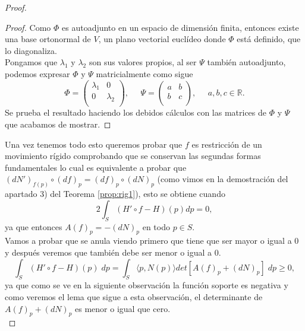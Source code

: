 \begin{proof}
	\begin{proof}
		Como $\Phi$ es autoadjunto en un espacio de dimensión finita, entonces existe una base ortonormal de $V$, un plano vectorial euclídeo donde $\Phi$ está definido, que lo diagonaliza.
		${ }$\\
		
		Pongamos que $\lambda_1$ y $\lambda_2$ son sus valores propios, al ser $\Psi$ también autoadjunto, podemos expresar $\Phi$ y $\Psi$ matricialmente como sigue
		${ }$\\
		\[
			\Phi = \left( {\begin{array}{cc}
				\lambda_1 & 0 \\
				0 & \lambda_2 \\
				\end{array} } \right),
			\;\;\;\;\;
			\Psi = \left( {\begin{array}{cc}
				a & b \\
				b & c \\
				\end{array} } \right), \;\;\;\;\; a, b,c \in \mathbb{R}.
		\]
		${ }$\\
		
		Se prueba el resultado haciendo los debidos cálculos con las matrices de $\Phi$ y $\Psi$ que acabamos de mostrar.
	\end{proof}
	${ }$\\
	
	Una vez tenemos todo esto queremos probar que $f$ es restricción de un movimiento rígido comprobando que se conservan las segundas formas fundamentales lo cual es equivalente a probar que $(dN')_{f(p)} \circ (df)_p = (df)_p \circ (dN)_p$ (como vimos en la demostración del apartado 3) del Teorema \ref{prop:rig1}), esto se obtiene cuando
	${ }$\\
	\[
		2\int_S (H' \circ f - H)(p) dp = 0,
	\]
	${ }$\\
	ya que entonces $A(f)_p = -(dN)_p$ en todo $p \in S$.
	${ }$\\
	
	Vamos a probar que se anula viendo primero que tiene que ser mayor o igual a 0 y después veremos que también debe ser menor o igual a 0.
	${ }$\\
	\[
		\int_S (H' \circ f - H)(p) \; dp = \int_S \langle p, N(p) \rangle det[A(f)_p + (dN)_p] \; dp \geq 0,
	\]
	${ }$\\
	ya que como se ve en la siguiente observación la función soporte es negativa y como veremos el lema que sigue a esta observación, el determinante de $A(f)_p + (dN)_p$ es menor o igual que cero.
${ }$\\


\end{proof}
